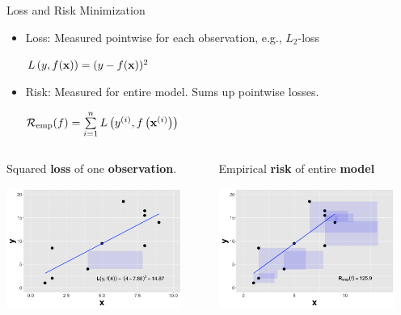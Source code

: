 \documentclass[11pt,compress,t,notes=noshow, xcolor=table]{beamer}
\begin{document}
\begin{vbframe}{Loss and Risk Minimization}

\begin{itemize}
\item Loss: Measured pointwise for each observation, e.g., $L_2$-loss
\begin{center}
$L\left(y, f(\mathbf{x})\right) = (y - f(\mathbf{x}))^2$
\end{center}
\item Risk: Measured for entire model. Sums up pointwise losses.
\begin{center}
$ \mathcal{R}_{\text{emp}}(f) = \sum\limits_{i=1}^n L\left(y^{(i)}, f\left(\mathbf{x}^{(i)}\right)\right) $
\end{center}
\hspace{1cm}
\end{itemize}
\begin{columns}
\begin{column}{0.5\textwidth}
\small Squared \textbf{loss} of one \textbf{observation}.
  \begin{center}
    \includegraphics[width=0.9\textwidth]{figure/nutshell-ml-basics-loss-regression.png}
  \end{center}
\end{column}
\begin{column}{0.5\textwidth}
\small Empirical \textbf{risk} of entire \textbf{model}

  \begin{center}
    \includegraphics[width=0.9\textwidth]{figure/nutshell-ml-basics-empirical-risk-regression.png}
  \end{center}
\end{column}
\end{columns}
\end{vbframe}
\end{document}
